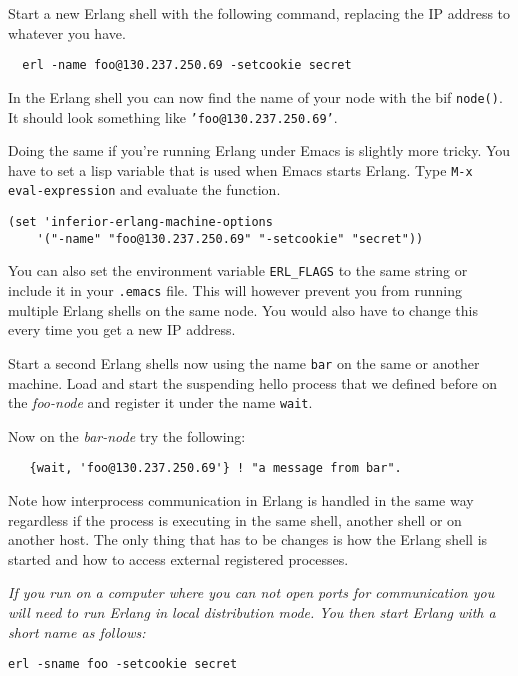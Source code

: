 \documentclass[a4paper, 11pt]{article}
\begin{document}
\noindent Start a new Erlang shell with the following command, replacing the IP
address to whatever you have.

\begin{verbatim}
  erl -name foo@130.237.250.69 -setcookie secret
\end{verbatim}

\noindent In the Erlang shell you can now find the name of your node with the
bif {\tt node()}. It should look something like {\tt 'foo@130.237.250.69'}. 

Doing the same if you're running Erlang under Emacs is slightly
more tricky. You have to set a lisp variable that is used when Emacs
starts Erlang. Type {\tt M-x eval-expression} and evaluate the function.

\begin{verbatim}
(set 'inferior-erlang-machine-options 
    '("-name" "foo@130.237.250.69" "-setcookie" "secret"))
\end{verbatim}

\noindent You can also set the environment variable {\tt ERL\_FLAGS} to the same
string or include it in your {\tt .emacs} file. This will however
prevent you from running multiple Erlang shells on the same node. You
would also have to change this every time you get a new IP address. 

Start a second Erlang shells now using the name {\tt bar} on the same
or another machine. Load and start the suspending hello process that
we defined before on the {\em foo-node} and register it under the name
{\tt wait}.

Now on the {\em bar-node} try the following:

\begin{verbatim}
   {wait, 'foo@130.237.250.69'} ! "a message from bar".
\end{verbatim}

\noindent Note how interprocess communication in Erlang is handled in the same
way regardless if the process is executing in the same shell, another
shell or on another host. The only thing that has to be changes is how
the Erlang shell is started and how to access external registered processes.

{\it If you run on a computer where you can not open ports for
  communication you will need to run Erlang in local distribution
  mode. You then start Erlang with a short name as follows:}

\begin{verbatim}
erl -sname foo -setcookie secret
\end{verbatim}
\end{document}
